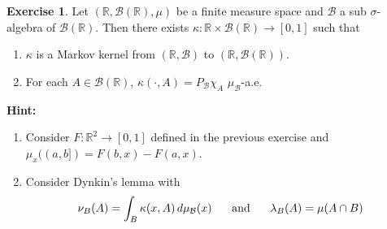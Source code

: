 \documentclass[12pt]{amsart}
\theoremstyle{definition}
\newtheorem{ex}[definition]{Exercise}
\newcommand{\lam}{\lambda}
\newcommand{\sig}{\sigma}
\newcommand{\kap}{\kappa}
\newcommand{\R}{\mathbb{R}}
\newcommand{\MB}{\mathcal{B}}
\newcommand{\dmu}{\, d \mu}
\begin{document}
	\begin{ex}
		Let $(\R, \MB(\R), \mu)$ be a finite measure space and $\MB$ a sub $\sig$-algebra of $\MB(\R)$. Then there exists $\kap: \R \times \MB(\R) \rightarrow [0,1]$ such that 
		\begin{enumerate}
			\item $\kap$ is a Markov kernel from $(\R, \MB)$ to $(\R, \MB(\R))$.
			\item For each $A \in \MB(\R)$, $\kap(\cdot, A) = P_{\MB}\chi_{A}$ $\mu_{\MB}$-a.e.
		\end{enumerate}
		\textbf{Hint:} 
		\begin{enumerate}
			\item Consider $F: \R^2 \rightarrow [0,1]$ defined in the previous exercise and $\mu_x((a,b]) = F(b,x) - F(a,x)$. 
			\item Consider Dynkin's lemma with $$\nu_B(A) = \int_B \kap(x, A) \dmu_{\MB}(x) \hspace{.5cm} \text{ and } \hspace{.5cm} \lam_B(A) = \mu(A \cap B)$$
		\end{enumerate}
	\end{ex}
	
\end{document}
